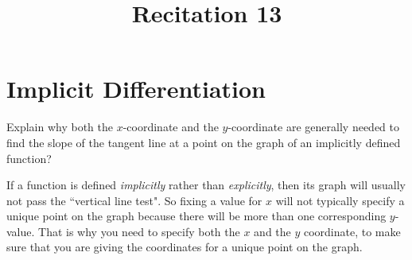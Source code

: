 \documentclass[handout]{ximera}
\title{Recitation 13}
\renewenvironment{freeResponse}{
\ifhandout\setbox0\vbox\bgroup\else
\begin{trivlist}\item[\hskip \labelsep\bfseries Solution:\hspace{2ex}]
\fi}
{\ifhandout\egroup\else
\end{trivlist}
\fi}
\begin{document}
\begin{abstract}		\end{abstract}
\maketitle

\section{Implicit Differentiation}
\begin{problem}[Warmup]
  Explain why both the $x$-coordinate and the $y$-coordinate are generally needed to find the slope of the tangent line at a point on the graph of an implicitly defined function?
\end{problem}
	\begin{freeResponse}
          If a function is defined \emph{implicitly} rather than \emph{explicitly}, then its graph will usually not pass the ``vertical line test".
          So fixing a value for $x$ will not typically specify a unique point on the graph because there will be more than one corresponding $y$-value.
          That is why you need to specify both the $x$ and the $y$ coordinate, to make sure that you are giving the coordinates for a unique point on the graph.
	\end{freeResponse}	
\end{document}
